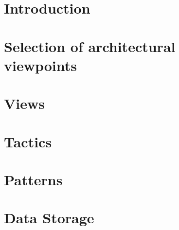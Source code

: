 \section{Introduction}
\section{Selection of architectural viewpoints}
\section{Views}
\section{Tactics}
\section{Patterns}
\section{Data Storage}

